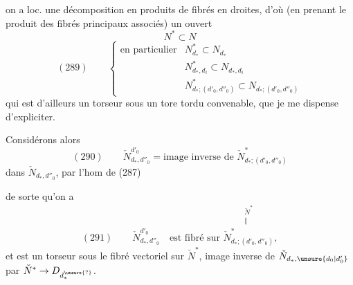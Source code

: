 on a loc. une décomposition en produits de fibrés en droites, d'où (en prenant le produit des fibrés principaux associés) un ouvert
\[
N^*\subset N
\]
\[
(289)\qquad\left\{\begin{array}{ll}
\text{en particulier}&N^*_{d_*}\subset N_{d_*}\\
&N^*_{d_*,d_i}\subset N_{d_*,d_i}\\
&N^*_{d_*;(d'_0,d''_0)}\subset N_{d_*;(d'_0,d''_0)}
\end{array}\right.
\]
qui est d'ailleurs un torseur sous un  tore tordu convenable, que je me dispense d'expliciter.

Considérons alors
\[
(290)\qquad\check N^{d'_0}_{d_*,d''_0}=\text{image inverse de }\check N^*_{d_*;(d'_0,d''_0)}
\]
dans $\check N_{d_*,d''_0}$, par l'hom
de (287)

de sorte qu'on a
\[
(291)\qquad\check N^{d'_0}_{d_*,d''_0}\quad\text{est fibré sur }\overset{\substack{\check N^*\\\Vert}}{\check N^*_{d_*;(d'_0,d''_0)}},
\]
et est un torseur sous le fibré vectoriel sur $\check N^*$, image inverse de $\check N_{d_*,\unsure{d_0|d'_0}}$ par $\check N^*\to D_{d^{\unsure{?}}_*}$.
